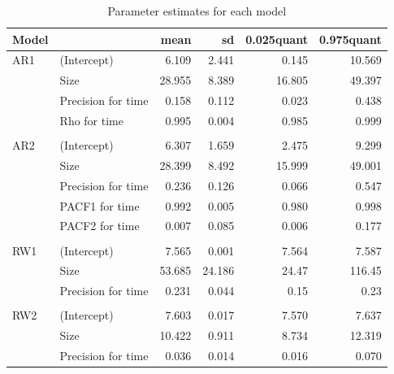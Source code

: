 \documentclass[10pt,letterpaper]{article}
\begin{document}
\begin{table}[!h]
	
	\caption{\label{tab:unnamed-chunk-11}Parameter estimates for each model}
	\centering
	\begin{tabular}[t]{l|l|r|r|r|r}
		\hline
		Model& & mean & sd & 0.025quant & 0.975quant\\
		\hline
		AR1&(Intercept) & 6.109 & 2.441 & 0.145 & 10.569\\
		&Size & 28.955 & 8.389 & 16.805 & 49.397\\
		&Precision for time & 0.158 & 0.112 & 0.023 & 0.438\\
		&Rho for time & 0.995 & 0.004 & 0.985 & 0.999\\
		\hline
		& &  &  &  & \\
		AR2&(Intercept) & 6.307 & 1.659 & 2.475 & 9.299\\
		&Size & 28.399 & 8.492 & 15.999 & 49.001\\
		&Precision for time & 0.236 & 0.126 & 0.066 & 0.547\\
		&PACF1 for time & 0.992 & 0.005 & 0.980 & 0.998\\
		&PACF2 for time & 0.007 & 0.085 & 0.006 & 0.177\\
		\hline
		& &  &  &  & \\
		RW1 & (Intercept) & 7.565 & 0.001 & 7.564 & 7.587\\
		& Size & 53.685 & 24.186 & 24.47 & 116.45\\
		& Precision for time & 0.231 & 0.044 & 0.15 & 0.23\\
		\hline
		& &  &  &  & \\
		RW2 & (Intercept) & 7.603 & 0.017 & 7.570 & 7.637\\
		& Size & 10.422 & 0.911 & 8.734 & 12.319\\
		& Precision for time & 0.036 & 0.014 & 0.016 & 0.070\\
		\hline
	\end{tabular}
\end{table}
\end{document}
